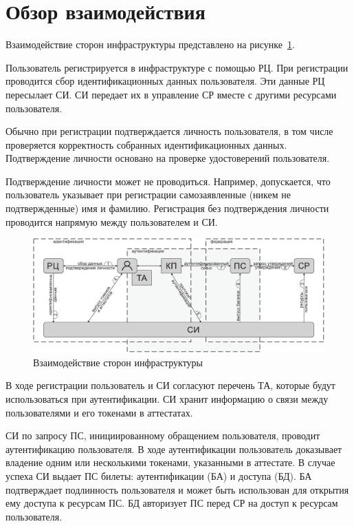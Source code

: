 \section{Обзор взаимодействия}\label{COMMON.Overview}

Взаимодействие сторон инфраструктуры представлено на 
рисунке~\ref{Fig.COMMON.Bias}.

Пользователь регистрируется в инфраструктуре с помощью РЦ. При регистрации
проводится сбор идентификационных данных пользователя. Эти данные РЦ пересылает 
СИ. СИ передает их в управление СР вместе с другими ресурсами пользователя.

Обычно при регистрации подтверждается личность пользователя, в том числе 
проверяется корректность собранных идентификационных данных. Подтверждение 
личности основано на проверке удостоверений пользователя.

Подтверждение личности может не проводиться. Например, допускается, что пользователь
указывает при регистрации самозаявленные (никем не подтвержденные) имя и
фамилию. Регистрация без подтверждения личности проводится напрямую между
пользователем и СИ.

\begin{figure}[hbt]
\begin{center}
\includegraphics[width=17cm]{../figs/bias}
\end{center}
\caption{Взаимодействие сторон инфраструктуры}
\label{Fig.COMMON.Bias}
\end{figure}


В ходе регистрации пользователь и СИ согласуют перечень ТА, которые будут 
использоваться при аутентификации. СИ хранит информацию о связи между 
пользователями и его токенами в аттестатах.

СИ по запросу ПС, инициированному обращением пользователя, проводит
аутентификацию пользователя. В ходе аутентификации пользователь доказывает
владение одним или несколькими токенами, указанными в аттестате.
%
В случае успеха СИ выдает ПС билеты: аутентификации (БА) и доступа (БД). 
%
БА подтверждает подлинность пользователя и может быть использован
для открытия ему доступа к ресурсам ПС.
%
БД авторизует ПС перед СР на доступ к ресурсам пользователя.

